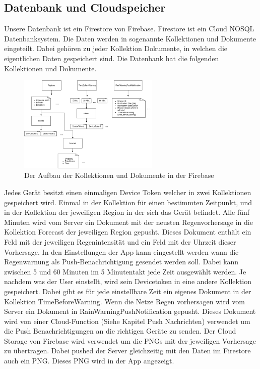 \subsection{Datenbank und Cloudspeicher}\label{datenbank und cloudspeicher}
Unsere Datenbank ist ein Firestore von Firebase. Firestore ist ein Cloud NOSQL Datenbanksystem. Die Daten werden in sogenannte Kollektionen und Dokumente eingeteilt. Dabei gehören zu jeder Kollektion Dokumente, in welchen die eigentlichen Daten gespeichert sind. Die Datenbank hat die folgenden Kollektionen und Dokumente.

\begin{figure}[h]
 \centering
 \includegraphics[width=0.6\textwidth,angle=0]{abb/firebase_aufbau}
 \caption[Datenbankarchitektur]{Der Aufbau der Kollektionen und Dokumente in der Firebase}
\label{fig:Beschreibung}
\end{figure}

Jedes Gerät besitzt einen einmaligen Device Token welcher in zwei Kollektionen gespeichert wird. Einmal in der Kollektion für einen bestimmten Zeitpunkt, und in der Kollektion der jeweiligen Region in der sich das Gerät befindet.
Alle fünf Minuten wird vom Server ein Dokument mit der neusten Regenvorhersage in die Kollektion Forecast der jeweiligen Region gepusht. Dieses Dokument enthält ein Feld mit der jeweiligen Regenintensität und ein Feld mit der Uhrzeit dieser Vorhersage. In den Einstellungen der App kann eingestellt werden wann die Regenwarnung als Push-Benachrichtigung gesendet werden soll. Dabei kann zwischen 5 und 60 Minuten im 5 Minutentakt jede Zeit ausgewählt werden. Je nachdem was der User einstellt, wird sein Devicetoken in eine andere Kollektion gespeichert. Dabei gibt es für jede einstellbare Zeit ein eigenes Dokument in der Kollektion TimeBeforeWarning. Wenn die Netze Regen vorhersagen wird vom Server ein Dokument in RainWarningPushNotification gepusht. Dieses Dokument wird von einer Cloud-Function (Siehe Kapitel Push Nachrichten) verwendet um die Push Benachrichtigungen an die richtigen Geräte zu senden.
Der Cloud Storage von Firebase wird verwendet um die PNGs mit der jeweiligen Vorhersage zu übertragen. Dabei pushed der Server gleichzeitig mit den Daten im Firestore auch ein PNG. Dieses PNG wird in der App angezeigt. 